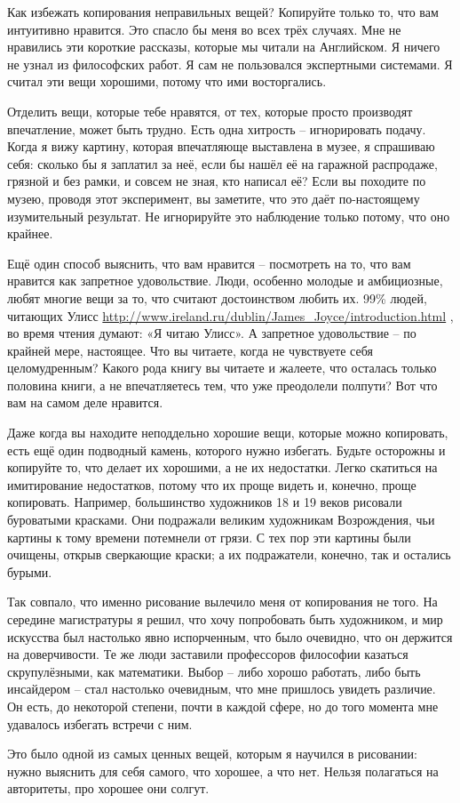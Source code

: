 \documentclass[ebook,12pt,oneside,openany]{memoir}
\begin{document}
Как избежать копирования неправильных вещей? Копируйте только то, что
вам интуитивно нравится. Это спасло бы меня во всех трёх случаях. Мне
не нравились эти короткие рассказы, которые мы читали на Английском. Я
ничего не узнал из философских работ. Я сам не пользовался экспертными
системами. Я считал эти вещи хорошими, потому что ими восторгались.

Отделить вещи, которые тебе нравятся, от тех, которые просто
производят впечатление, может быть трудно. Есть одна хитрость –
игнорировать подачу. Когда я вижу картину, которая впечатляюще
выставлена в музее, я спрашиваю себя: сколько бы я заплатил за неё,
если бы нашёл её на гаражной распродаже, грязной и без рамки, и совсем
не зная, кто написал её? Если вы походите по музею, проводя этот
эксперимент, вы заметите, что это даёт по-настоящему изумительный
результат. Не игнорируйте это наблюдение только потому, что оно
крайнее.

Ещё один способ выяснить, что вам нравится – посмотреть на то, что вам
нравится как запретное удовольствие. Люди, особенно молодые и
амбициозные, любят многие вещи за то, что считают достоинством любить
их. 99\% людей, читающих Улисс
\url{http://www.ireland.ru/dublin/James_Joyce/introduction.html} , во
время чтения думают: «Я читаю Улисс». А запретное удовольствие – по
крайней мере, настоящее. Что вы читаете, когда не чувствуете себя
целомудренным? Какого рода книгу вы читаете и жалеете, что осталась
только половина книги, а не впечатляетесь тем, что уже преодолели
полпути? Вот что вам на самом деле нравится.

Даже когда вы находите неподдельно хорошие вещи, которые можно
копировать, есть ещё один подводный камень, которого нужно избегать.
Будьте осторожны и копируйте то, что делает их хорошими, а не их
недостатки. Легко скатиться на имитирование недостатков, потому что их
проще видеть и, конечно, проще копировать. Например, большинство
художников 18 и 19 веков рисовали буроватыми красками. Они подражали
великим художникам Возрождения, чьи картины к тому времени потемнели
от грязи. С тех пор эти картины были очищены, открыв сверкающие
краски; а их подражатели, конечно, так и остались бурыми.

Так совпало, что именно рисование вылечило меня от копирования не
того. На середине магистратуры я решил, что хочу попробовать быть
художником, и мир искусства был настолько явно испорченным, что было
очевидно, что он держится на доверчивости. Те же люди заставили
профессоров философии казаться скрупулёзными, как математики. Выбор –
либо хорошо работать, либо быть инсайдером – стал настолько очевидным,
что мне пришлось увидеть различие. Он есть, до некоторой степени,
почти в каждой сфере, но до того момента мне удавалось избегать
встречи с ним.

Это было одной из самых ценных вещей, которым я научился в рисовании:
нужно выяснить для себя самого, что хорошее, а что нет. Нельзя
полагаться на авторитеты, про хорошее они солгут.
\end{document}
